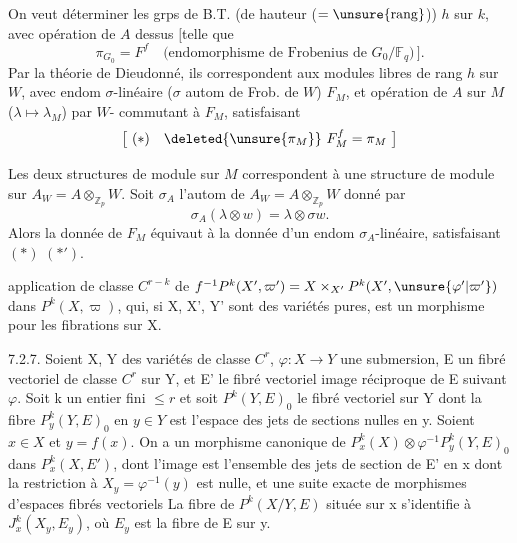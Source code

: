 On veut déterminer  les grps de B.T.  (de hauteur ($=\unsure{\mathrm{rang}}$)) $h$ sur  $k$, avec opération de $A$ dessus $[$telle que
\[
\pi_{G_0}=F^f\quad\text{(endomorphisme de Frobenius de $G_0/\mathbb F_q$)}\,].
\]
Par la théorie de Dieudonné, ils correspondent aux modules libres  de rang $h$ sur $W$, avec endom $\sigma$-linéaire ($\sigma$ autom de Frob. de $W$) $F_M$, et opération de $A$ sur $M$ ($\lambda\mapsto\lambda_M$) par $W$- commutant à $F_M$, satisfaisant
\[
\bigl[\ (*)\quad\deleted{\unsure{\pi_M}}\ F_M^f=\pi_M\ \bigr]
\]

Les deux structures de module sur $M$ correspondent à une structure de module sur $A_W=A\otimes_{\mathbb Z_p}W$. Soit  $\sigma_A$ l'autom de $A_W=A\otimes_{\mathbb Z_p}W$ donné par
\[
\sigma_A(\lambda\otimes w)=\lambda\otimes\sigma w.
\]
Alors la donnée de $F_M$ équivaut à la donnée d'un endom $\sigma_A$-linéaire, satisfaisant $(*)$ $(*')$.

application de classe $C^{r-k}$ de $f^{-1}P^k(X',\varpi')=X\times_{X'}P^k(X',\unsure{\varphi'|\varpi'})$ dans $P^k(X,\varpi)$, qui, si X, X', Y' sont des variétés pures, est un morphisme pour les fibrations sur X.

7.2.7. Soient X, Y des variétés de classe $C^r$, $\varphi:X\longrightarrow Y$ une submersion, E un fibré vectoriel de classe $C^r$ sur Y, et E' le fibré vectoriel image réciproque de E suivant $\varphi$. Soit k un entier fini $\leq r$ et soit $P^k(Y,E)_0$ le fibré vectoriel sur Y dont la fibre $P_y^k(Y,E)_0$ en $y\in Y$ est l'espace des jets de sections nulles en y. Soient $x\in X$ et $y=f(x)$. On a un morphisme canonique de $P_x^k(X)\otimes\varphi^{-1}P_y^k(Y,E)_0$ dans $P_x^k(X,E')$, dont l'image est l'ensemble des jets de section de E' en x dont la restriction à $X_y=\varphi^{-1}(y)$ est nulle, et une suite exacte de morphismes d'espaces fibrés vectoriels
La fibre de $P^k(X/Y,E)$ située sur x s'identifie à $J_x^k(X_y,E_y)$, où $E_y$ est la fibre de E sur y.

